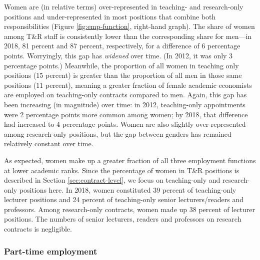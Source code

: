 \documentclass[a4paper, 1]{article}
\begin{document}
Women are (in relative terms) over-represented in teaching- and research-only positions and under-represented in most positions that combine both responsibilities (Figure \ref{fig:emp-function}, right-hand graph). The share of women among T\&R staff is consistently lower than the corresponding share for men---in 2018, 81 percent and 87 percent, respectively, for a difference of 6 percentage points. Worryingly, this gap has \emph{widened} over time. (In 2012, it was only 3 percentage points.) Meanwhile, the proportion of all women in teaching only positions (15 percent) is greater than the proportion of all men in those same positions (11 percent), meaning a greater fraction of female academic economists are employed on teaching-only contracts compared to men. Again, this gap has been increasing (in magnitude) over time: in 2012, teaching-only appointments were 2 percentage points more common among women; by 2018, that difference had increased to 4 percentage points. Women are also slightly over-represented among research-only positions, but the gap between genders has remained relatively constant over time.

As expected, women make up a greater fraction of all three employment functions at lower academic ranks. Since the percentage of women in T\&R positions is described in Section \ref{sec:contract-level}, we focus on teaching-only and research-only positions here. In 2018, women constituted 39 percent of teaching-only lecturer positions and 24 percent of teaching-only senior lecturers/readers and professors. Among research-only contracts, women made up 38 percent of lecturer positions. The numbers of senior lecturers, readers and professors on research contracts is negligible.

\hypertarget{part-time-employment}{%
\subsubsection{Part-time employment}\label{part-time-employment}}
\end{document}
